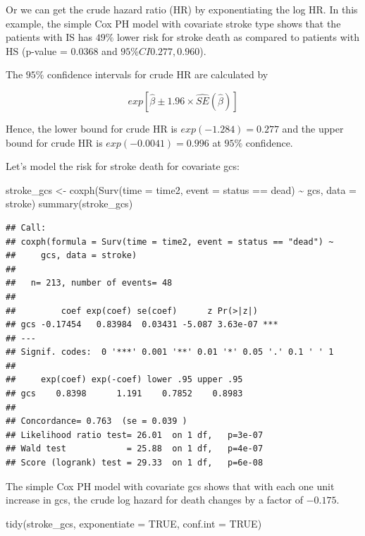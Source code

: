 \documentclass[
  10pt,
]{krantz}
\newenvironment{Shaded}{\begin{snugshade}}{\end{snugshade}}
\newcommand{\AttributeTok}[1]{\textcolor[rgb]{0.77,0.63,0.00}{#1}}
\newcommand{\ConstantTok}[1]{\textcolor[rgb]{0.00,0.00,0.00}{#1}}
\newcommand{\FunctionTok}[1]{\textcolor[rgb]{0.00,0.00,0.00}{#1}}
\newcommand{\NormalTok}[1]{#1}
\newcommand{\OtherTok}[1]{\textcolor[rgb]{0.56,0.35,0.01}{#1}}
\newcommand{\SpecialCharTok}[1]{\textcolor[rgb]{0.00,0.00,0.00}{#1}}
\newcommand{\StringTok}[1]{\textcolor[rgb]{0.31,0.60,0.02}{#1}}
\begin{document}
Or we can get the crude hazard ratio (HR) by exponentiating the log HR. In this example, the simple Cox PH model with covariate stroke type shows that the patients with IS has \(49\%\) lower risk for stroke death as compared to patients with HS (p-value = 0.0368 and \(95\% CI 0.277, 0.960\)).

The \(95\%\) confidence intervals for crude HR are calculated by

\[exp[\hat\beta \pm 1.96 \times \widehat{SE}(\hat\beta)]\]

Hence, the lower bound for crude HR is \(exp(-1.284)= 0.277\) and the upper bound for crude HR is \(exp(-0.0041) = 0.996\) at \(95\%\) confidence.

Let's model the risk for stroke death for covariate gcs:

\begin{Shaded}
\begin{Highlighting}[]
\NormalTok{stroke\_gcs }\OtherTok{\textless{}{-}} 
  \FunctionTok{coxph}\NormalTok{(}\FunctionTok{Surv}\NormalTok{(}\AttributeTok{time =}\NormalTok{ time2, }
             \AttributeTok{event =}\NormalTok{ status }\SpecialCharTok{==} \StringTok{\textquotesingle{}dead\textquotesingle{}}\NormalTok{) }\SpecialCharTok{\textasciitilde{}}\NormalTok{ gcs,}
                     \AttributeTok{data =}\NormalTok{ stroke)}
\FunctionTok{summary}\NormalTok{(stroke\_gcs)}
\end{Highlighting}
\end{Shaded}

\begin{verbatim}
## Call:
## coxph(formula = Surv(time = time2, event = status == "dead") ~ 
##     gcs, data = stroke)
## 
##   n= 213, number of events= 48 
## 
##         coef exp(coef) se(coef)      z Pr(>|z|)    
## gcs -0.17454   0.83984  0.03431 -5.087 3.63e-07 ***
## ---
## Signif. codes:  0 '***' 0.001 '**' 0.01 '*' 0.05 '.' 0.1 ' ' 1
## 
##     exp(coef) exp(-coef) lower .95 upper .95
## gcs    0.8398      1.191    0.7852    0.8983
## 
## Concordance= 0.763  (se = 0.039 )
## Likelihood ratio test= 26.01  on 1 df,   p=3e-07
## Wald test            = 25.88  on 1 df,   p=4e-07
## Score (logrank) test = 29.33  on 1 df,   p=6e-08
\end{verbatim}

The simple Cox PH model with covariate gcs shows that with each one unit increase in gcs, the crude log hazard for death changes by a factor of \(-0.175\).

\begin{Shaded}
\begin{Highlighting}[]
\FunctionTok{tidy}\NormalTok{(stroke\_gcs,}
     \AttributeTok{exponentiate =} \ConstantTok{TRUE}\NormalTok{,}
     \AttributeTok{conf.int =} \ConstantTok{TRUE}\NormalTok{)}
\end{Highlighting}
\end{Shaded}
\end{document}
